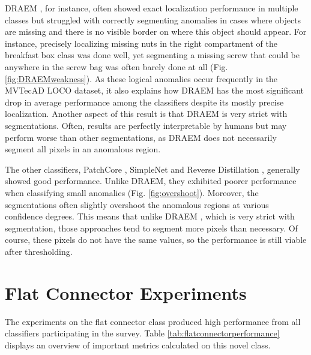 DRAEM \cite{Zavrtanik_2021DRAEM}, for instance, often showed exact localization performance in multiple classes but struggled 
with correctly segmenting anomalies in cases where objects are missing and there is no visible border on where this object should 
appear. For instance, precisely localizing missing nuts in the right compartment of the breakfast box class was done well, yet 
segmenting a missing screw that could be anywhere in the screw bag was often barely done at all (Fig. \ref{fig:DRAEMweakness}). As these logical anomalies occur 
frequently in the MVTecAD LOCO \cite{LOCODentsAndScratchesBergmann2022} dataset, it also explains how DRAEM 
has the most significant drop in average performance among the classifiers despite its mostly precise localization. Another aspect of this result is that DRAEM is very strict with 
segmentations. Often, results are perfectly interpretable by humans but may perform worse than other segmentations, as DRAEM does not necessarily segment all pixels in 
an anomalous region.



The other classifiers, PatchCore \cite{patchCore2022}, SimpleNet \cite{liu2023simplenet} and Reverse Distillation \cite{revdist2023}, generally showed good performance. Unlike DRAEM, they exhibited 
poorer performance when classifying small anomalies (Fig. \ref{fig:overshoot}). Moreover, the segmentations often slightly overshoot the anomalous regions at various confidence 
degrees. This means that unlike DRAEM \cite{Zavrtanik_2021DRAEM}, which is very strict with segmentation, those approaches tend to segment more pixels than necessary. 
Of course, these pixels do not have the same values, so the performance is still viable after thresholding. 





\section{Flat Connector Experiments}
\label{sec:faltconnectorxperiments}

The experiments on the flat connector class produced high performance from all classifiers participating in the survey. Table \ref{tab:flatconnectorperformance} 
displays an overview of important metrics calculated on this novel class.



